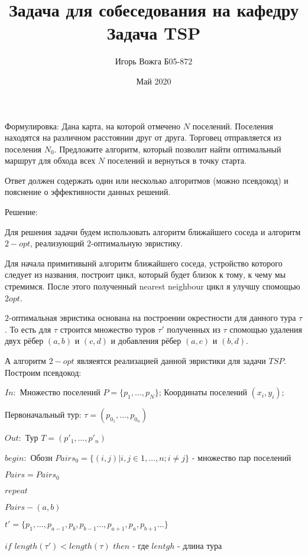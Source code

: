 \documentclass[a4paper,12pt]{article}
\begin{document}
	
\title{Задача для собеседования на кафедру}
	
\author{Игорь Вожга Б05-872 }
\date{Май 2020}
\maketitle
\newpage
\title{ \bf{Задача TSP}}

Формулировка: Дана карта, на которой отмечено $N$ поселений. Поселения находятся на различном расстоянии друг от друга. Торговец отправляется из поселения $N_0$. Предложите алгоритм, который позволит найти оптимальный маршрут для обхода всех $N$ поселений и вернуться в точку старта.

Ответ должен содержать один или несколько алгоритмов (можно псевдокод) и пояснение о эффективности данных решений.

Решение:

Для решения задачи будем использовать алгоритм ближайшего соседа и алгоритм $2-opt$, реализующий  $2$-оптимальную эвристику.

Для начала примитивынй алгоритм ближайшего соседа, устройство которого следует из названия, построит цикл, который будет близок к тому, к чему мы стремимся. После этого полученный nearest neighbour цикл я улучшу спомощью $2opt$.

$2$-оптимальная эвристика основана на построении окрестности для данного тура $\tau$. То есть для $\tau$ строится множество туров $\tau'$ полученных из $\tau$ спомощью удаления двух рёбер $(a,b)$ и $(c, d)$ и добавления рёбер $(a, c)$ и $(b, d)$. 

А алгоритм $2-opt$  являеятся реализацией данной эвристики для задачи $TSP$. Построим псевдокод:

$In:$ Множество поселений $P =\{p_1, \dots, p_N\} $; Координаты поселений $(x_i, y_i)$; 

Первоначальный тур: $\tau = (p_{0_1}, \dots , p_{0_n})$

$Out:$ Тур $T=(p'_1, \dots, p'_n)$

$begin:$
Обозн $Pairs_0=\{(i,j)| i, j \in {1,\dots,n} ;i\neq j \} $ - множество пар поселений

$Pairs = Pairs_0$

$repeat$

$Pairs - (a, b)$

$t' = \{p_1, \dots, p_{a-1}, p_{b}, p_{b-1} \dots , p_{a+1}, p_a, p_{b+1} \dots\}$

$if$ $length(\tau')<length(\tau)$ $then$ - где $lentgh$ - длина тура
\end{document}
